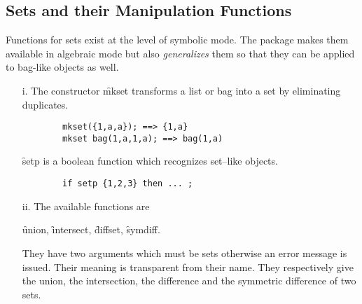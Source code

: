 \subsection{Sets and their Manipulation Functions}
Functions for sets exist at the level of symbolic mode. The
package makes them available in algebraic mode but also \emph{generalizes}
them so that they can be applied to bag-like objects as well.
\begin{itemize}
\item[i.]
  \hypertarget{operator:MKSET}{}
The constructor \f{mkset} transforms a list or bag into a set by eliminating
duplicates.
\begin{verbatim}
        mkset({1,a,a}); ==> {1,a}
        mkset bag(1,a,1,a); ==> bag(1,a)
\end{verbatim}
\hypertarget{operator:SETP}{}
\f{setp} is a boolean function which recognizes set--like objects.
\begin{verbatim}
        if setp {1,2,3} then ... ;
\end{verbatim}
\item[ii.]
\hypertarget{operator:UNION}{}
\hypertarget{operator:INTERSECT}{}
\hypertarget{operator:DIFFSET}{}
\hypertarget{operator:SYMDIFF}{}
The available functions are
\begin{center}
\f{union}, \f{intersect}, \f{diffset}, \f{symdiff}.
\end{center}
They have two arguments which must be sets otherwise an error message
is issued.
Their meaning is transparent from their name. They respectively give the
union, the intersection, the difference and the symmetric difference of two
sets.
\end{itemize}
